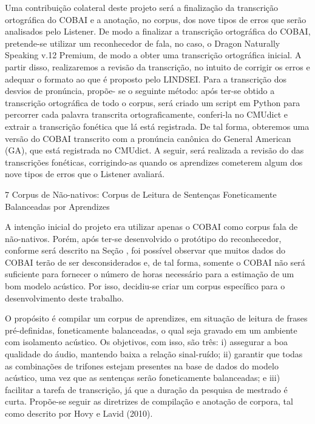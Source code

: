 Uma contribui\c{c}\~ao colateral deste projeto ser\'a a finaliza\c{c}\~ao da
transcri\c{c}\~ao ortogr\'afica do COBAI e a anota\c{c}\~ao, no corpus, dos nove tipos
de erros que ser\~ao analisados pelo Listener. De modo a finalizar a
transcri\c{c}\~ao ortogr\'afica do COBAI, pretende-se utilizar um reconhecedor
de fala, no caso, o Dragon Naturally Speaking v.12 Premium, de modo a
obter uma transcri\c{c}\~ao ortogr\'afica inicial. A partir disso, realizaremos
a revis\~ao da transcri\c{c}\~ao, no intuito de corrigir os erros e adequar o
formato ao que \'e proposto pelo LINDSEI. Para a transcri\c{c}\~ao dos desvios
de pron\'uncia, prop\~oe- se o seguinte m\'etodo: ap\'os ter-se obtido a
transcri\c{c}\~ao ortogr\'afica de todo o corpus, ser\'a criado um script em
Python para percorrer cada palavra transcrita ortograficamente,
conferi-la no CMUdict e extrair a transcri\c{c}\~ao fon\'etica que l\'a est\'a
registrada. De tal forma, obteremos uma vers\~ao do COBAI transcrito com a
pron\'uncia can\^onica do General American (GA), que est\'a registrada no
CMUdict. A seguir, ser\'a realizada a revis\~ao do das transcri\c{c}\~oes
fon\'eticas, corrigindo-as quando os aprendizes cometerem algum dos nove
tipos de erros que o Listener avaliar\'a.

7 Corpus de N\~ao-nativos: Corpus de Leitura de Senten\c{c}as Foneticamente
Balanceadas por Aprendizes

A inten\c{c}\~ao inicial do projeto era utilizar apenas o COBAI como corpus
fala de n\~ao-nativos. Por\'em, ap\'os ter-se desenvolvido o prot\'otipo do
reconhecedor, conforme ser\'a descrito na Se\c{c}\~ao , foi poss\'ivel observar
que muitos dados do COBAI ter\~ao de ser desconsiderados e, de tal forma,
somente o COBAI n\~ao ser\'a suficiente para fornecer o n\'umero de horas
necess\'ario para a estima\c{c}\~ao de um bom modelo ac\'ustico. Por isso,
decidiu-se criar um corpus espec\'ifico para o desenvolvimento deste
trabalho.

O prop\'osito \'e compilar um corpus de aprendizes, em situa\c{c}\~ao de leitura
de frases pr\'e-definidas, foneticamente balanceadas, o qual seja gravado
em um ambiente com isolamento ac\'ustico. Os objetivos, com isso, s\~ao
tr\^es: i) assegurar a boa qualidade do \'audio, mantendo baixa a rela\c{c}\~ao
sinal-ru\'ido; ii) garantir que todas as combina\c{c}\~oes de trifones estejam
presentes na base de dados do modelo ac\'ustico, uma vez que as senten\c{c}as
ser\~ao foneticamente balanceadas; e iii) facilitar a tarefa de
transcri\c{c}\~ao, j\'a que a dura\c{c}\~ao da pesquisa de mestrado \'e curta. Prop\~oe-se
seguir as diretrizes de compila\c{c}\~ao e anota\c{c}\~ao de corpora, tal como
descrito por Hovy e Lavid (2010).

